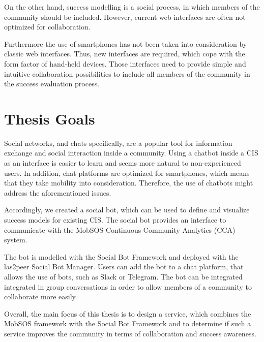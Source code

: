On the other hand, success modelling is a social process, in which members of the community should be included. However, current web interfaces are often not optimized for collaboration.

Furthermore the use of smartphones has not been taken into consideration by classic web interfaces.
Thus, new interfaces are required, which cope with the form factor of hand-held devices. Those interfaces need to provide simple and intuitive collaboration possibilities to include all members of the community in the success evaluation process. 

\section{Thesis Goals}

Social networks, and chats specifically, are a popular tool for information exchange and social interaction inside a community.
Using a chatbot inside a CIS as an interface is easier to learn and seems more natural to non-experienced users.
In addition, chat platforms are optimized for smartphones, which means that they take mobility into consideration. Therefore, the use of chatbots might address the aforementioned issues.

Accordingly, we created a social bot, which can be used to define and visualize success models for existing CIS. The social bot provides an interface to communicate with the MobSOS Continuous Community Analytics (CCA) system.

The bot is modelled with the Social Bot Framework and deployed with the las2peer Social Bot Manager. Users can add the bot to a chat platform, that allows the use of bots, such as Slack or Telegram.
The bot can be integrated integrated in group conversations in order to allow members of a community to collaborate more easily.

Overall, the main focus of this thesis is to design a service, which combines the MobSOS framework with the Social Bot Framework and to determine if such a service improves the community in terms of collaboration and success awareness.